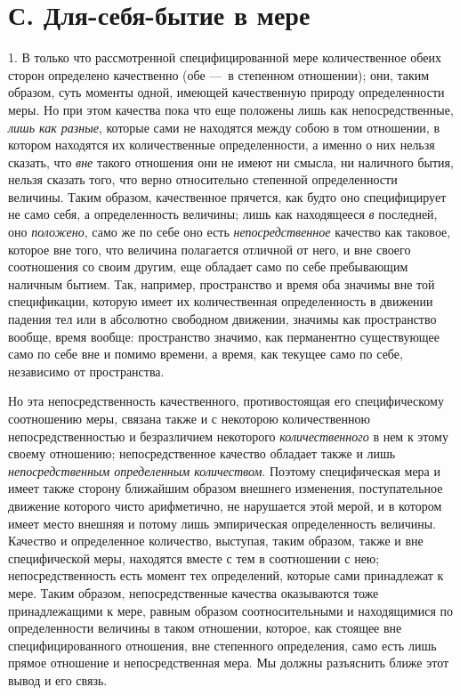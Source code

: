 \section[С. Для-себя-бытие в мере]{С. Для-себя-бытие в мере}
1. В только что рассмотренной специфицированной
мере количественное обеих сторон определено качественно (обе —~в степенном
отношении); они, таким образом, суть моменты одной, имеющей качественную
природу определенности меры. Но при этом качества пока что еще положены
лишь как непосредственные, {\em лишь как разные},
которые сами не находятся между собою в том отношении, в котором находятся
их количественные определенности, а именно о них нельзя сказать, что
{\em вне} такого отношения они не имеют ни смысла, ни
наличного бытия, нельзя сказать того, что верно относительно степенной
определенности величины. Таким образом, качественное прячется, как будто
оно специфицирует не само себя, а определенность величины; лишь как
находящееся {\em в} последней, оно
{\em положено}, само же по себе оно есть
{\em непосредственное} качество как таковое, которое
вне того, что величина полагается отличной от него, и вне своего
соотношения со своим другим, еще обладает само по себе пребывающим наличным
бытием. Так, например, пространство и время оба значимы вне той
спецификации, которую имеет их количественная определенность в движении
падения тел или в абсолютно свободном движении, значимы как пространство
вообще, время вообще: пространство значимо, как перманентно существующее
само по себе вне и помимо времени, а время, как текущее само по себе,
независимо от пространства.

Но эта непосредственность качественного, противостоящая его специфическому
соотношению меры, связана также и с некоторою количественною
непосредственностью и безразличием некоторого
{\em количественного} в нем к этому своему отношению;
непосредственное качество обладает также и лишь
{\em непосредственным определенным количеством}.
Поэтому специфическая мера и имеет также сторону ближайшим образом внешнего
изменения, поступательное движение которого чисто арифметично, не
нарушается этой мерой, и в котором имеет место внешняя и потому лишь
эмпирическая определенность величины. Качество и определенное количество,
выступая, таким образом, также и вне специфической меры, находятся вместе с
тем в соотношении с нею; непосредственность есть момент тех определений,
которые сами принадлежат к мере. Таким образом, непосредственные качества
оказываются тоже принадлежащими к мере, равным образом соотносительными и
находящимися по определенности величины в таком отношении, которое, как
стоящее вне специфицированного отношения, вне степенного определения, само
есть лишь прямое отношение и непосредственная мера. Мы должны разъяснить
ближе этот вывод и его связь.

